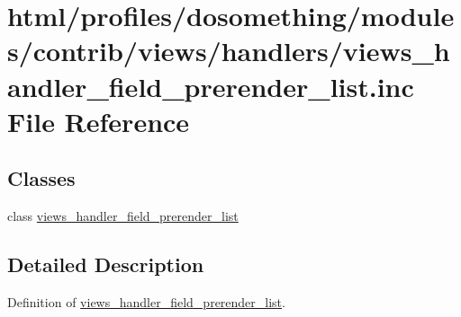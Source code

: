 \hypertarget{views__handler__field__prerender__list_8inc}{
\section{html/profiles/dosomething/modules/contrib/views/handlers/views\_\-handler\_\-field\_\-prerender\_\-list.inc File Reference}
\label{views__handler__field__prerender__list_8inc}
}
\subsection*{Classes}
\begin{DoxyCompactItemize}
\item 
class \hyperlink{classviews__handler__field__prerender__list}{views\_\-handler\_\-field\_\-prerender\_\-list}
\end{DoxyCompactItemize}


\subsection{Detailed Description}
Definition of \hyperlink{classviews__handler__field__prerender__list}{views\_\-handler\_\-field\_\-prerender\_\-list}. 